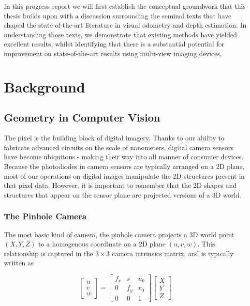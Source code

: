 \documentclass[openany]{book}
\begin{document}
In this progress report we will first establish the conceptual groundwork that this thesis builds upon with a discussion surrounding the seminal texts that have shaped the state-of-the-art literature in visual odometry and depth estimation. In understanding those texts, we demonstrate that existing methods have yielded excellent results, whilst identifying that there is a substantial potential for improvement on state-of-the-art results using multi-view imaging devices. 



\chapter{Background}

\section{Geometry in Computer Vision}

The pixel is the building block of digital imagery. Thanks to our ability to fabricate advanced circuits on the scale of nanometers, digital camera sensors have become ubiquitous - making their way into all manner of consumer devices. Because the photodiodes in camera sensors are typically arranged on a 2D plane, most of our operations on digital images manipulate the 2D structures present in that pixel data. However, it is important to remember that the 2D shapes and structures that appear on the sensor plane are projected versions of a 3D world. 

\subsection{The Pinhole Camera}

The most basic kind of camera, the pinhole camera projects a 3D world point $(X, Y, Z)$ to a homogenous coordinate on a 2D plane $(u, v, w)$. This relationship is captured in the $3 \times 3$ camera intrinsics matrix, and is typically written as 

\begin{equation}
\begin{bmatrix}
    u\\
    v\\
    w
\end{bmatrix} = 
\begin{bmatrix}
    f_x & s & u_0 \\ 
    0 & f_y  & v_0 \\ 
    0 & 0 & 1 
\end{bmatrix}
\begin{bmatrix}
    X \\
    Y \\
    Z
\end{bmatrix}
\end{equation}
\end{document}
